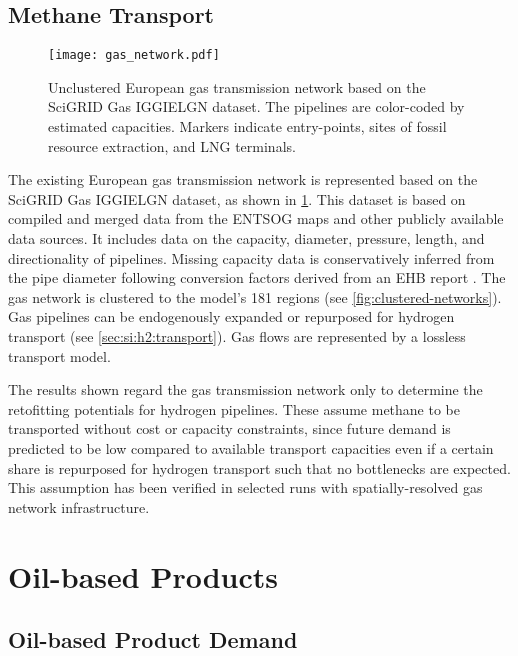 \subsection{Methane Transport}
\label{sec:si:methane:transport}

\begin{figure}
    \texttt{[image: gas\_network.pdf]}
    \label{fig:gas-raw}
    \caption{Unclustered European gas transmission network based on the
    SciGRID Gas IGGIELGN dataset. The pipelines are color-coded by estimated capacities. Markers indicate entry-points, sites of fossil resource extraction, and LNG terminals.}
\end{figure}

The existing European gas transmission network is represented based on the
SciGRID Gas IGGIELGN dataset, as shown in
\cref{fig:gas-raw}. This dataset is based on compiled and merged data from the
ENTSOG maps and other publicly available
data sources. It includes data on the capacity, diameter, pressure, length, and
directionality of pipelines. Missing capacity data is conservatively inferred
from the pipe diameter following conversion factors derived from an EHB report
. The gas network is clustered to the
model's 181 regions (see \cref{fig:clustered-networks}). Gas pipelines can be
endogenously expanded or repurposed for hydrogen transport (see
\cref{sec:si:h2:transport}). Gas flows are represented by a lossless transport
model.

The results shown regard the gas transmission network only to determine the
retofitting potentials for hydrogen pipelines. These assume methane to be
transported without cost or capacity constraints, since future demand is
predicted to be low compared to available transport capacities even if a certain
share is repurposed for hydrogen transport such that no bottlenecks are
expected. This assumption has been verified in selected runs with
spatially-resolved gas network infrastructure.

\section{Oil-based Products}
\label{sec:si:oil}

\subsection{Oil-based Product Demand}
\label{sec:si:demand}

